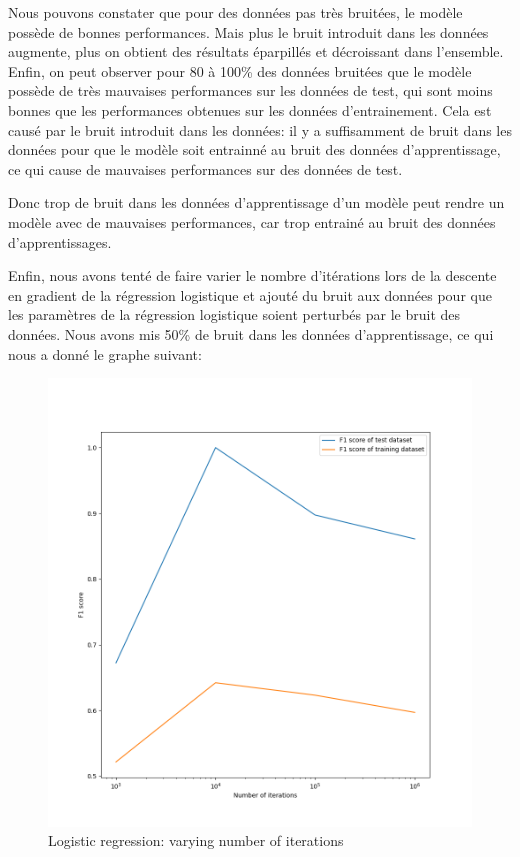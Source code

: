 \documentclass[
]{article}
\begin{document}
Nous pouvons constater que pour des données pas très bruitées, le modèle
possède de bonnes performances. Mais plus le bruit introduit dans les
données augmente, plus on obtient des résultats éparpillés et
décroissant dans l'ensemble. Enfin, on peut observer pour 80 à 100\% des
données bruitées que le modèle possède de très mauvaises performances
sur les données de test, qui sont moins bonnes que les performances
obtenues sur les données d'entrainement. Cela est causé par le bruit
introduit dans les données: il y a suffisamment de bruit dans les
données pour que le modèle soit entrainné au bruit des données
d'apprentissage, ce qui cause de mauvaises performances sur des données
de test.

Donc trop de bruit dans les données d'apprentissage d'un modèle peut
rendre un modèle avec de mauvaises performances, car trop entrainé au
bruit des données d'apprentissages.

Enfin, nous avons tenté de faire varier le nombre d'itérations lors de
la descente en gradient de la régression logistique et ajouté du bruit
aux données pour que les paramètres de la régression logistique soient
perturbés par le bruit des données. Nous avons mis 50\% de bruit dans
les données d'apprentissage, ce qui nous a donné le graphe suivant:

\begin{figure}
\centering
\includegraphics{../res/overfitting_test.png}
\caption{Logistic regression: varying number of iterations}
\end{figure}
\end{document}
